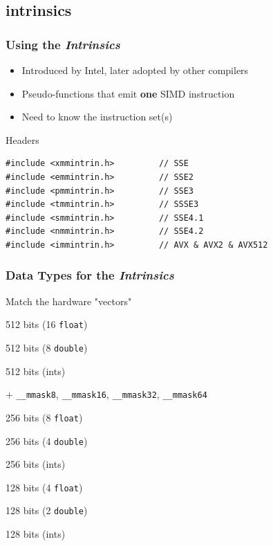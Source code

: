\documentclass[xcolor={x11names,svgnames}]{beamer}
\begin{document}
\subsection{intrinsics}

\begin{frame}[fragile=singleslide]
  \frametitle{Using the \emph{Intrinsics}}

  \begin{itemize}
  \item Introduced by Intel, later adopted by other compilers
  \item Pseudo-functions that emit \textbf{one} SIMD instruction
  \item Need to know the instruction set(s)
  \end{itemize}
  
  
\begin{block}{Headers}
  \begin{verbatim}
#include <xmmintrin.h>         // SSE
#include <emmintrin.h>         // SSE2
#include <pmmintrin.h>         // SSE3
#include <tmmintrin.h>         // SSSE3
#include <smmintrin.h>         // SSE4.1
#include <nmmintrin.h>         // SSE4.2
#include <immintrin.h>         // AVX & AVX2 & AVX512
\end{verbatim}
\end{block}

\end{frame}


\begin{frame}[fragile=singleslide]
  \frametitle{Data Types for the \emph{Intrinsics}}

\begin{block}{Match the hardware "vectors"}
  
  \begin{description}
  \item[\texttt{\_\_m512}] 512 bits (16 \texttt{float})
  \item[\texttt{\_\_m512d}] 512 bits (8 \texttt{double})
  \item[\texttt{\_\_m512i}] 512 bits (ints)
  \item + \texttt{\_\_mmask8}, \texttt{\_\_mmask16}, \texttt{\_\_mmask32}, \texttt{\_\_mmask64}
    
  \item[\texttt{\_\_m256}] 256 bits (8 \texttt{float})
  \item[\texttt{\_\_m256d}] 256 bits (4 \texttt{double})
  \item[\texttt{\_\_m256i}] 256 bits (ints)
    
  \item[\texttt{\_\_m128}] 128 bits (4 \texttt{float})
  \item[\texttt{\_\_m128d}] 128 bits (2 \texttt{double})
  \item[\texttt{\_\_m128i}] 128 bits (ints)
  \end{description}
\end{block}
\end{frame}
\end{document}
